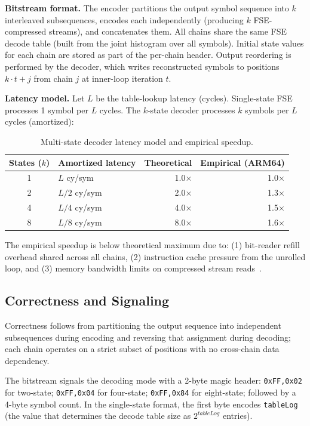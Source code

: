 \documentclass[journal]{IEEEtran}
\begin{document}
\textbf{Bitstream format.} The encoder partitions the output symbol
sequence into $k$ interleaved subsequences, encodes each independently
(producing $k$ FSE-compressed streams), and concatenates them. All chains
share the same FSE decode table (built from the joint histogram over all
symbols). Initial state values for each chain are stored as part of the
per-chain header. Output reordering is performed by the decoder, which
writes reconstructed symbols to positions $k\cdot t + j$ from chain $j$
at inner-loop iteration $t$.

\textbf{Latency model.} Let $L$ be the table-lookup latency (cycles).
Single-state FSE processes 1 symbol per $L$ cycles. The $k$-state decoder
processes $k$ symbols per $L$ cycles (amortized):

\begin{table}[htbp]
\centering
\caption{Multi-state decoder latency model and empirical speedup.}
\label{tab:latency}
\begin{tabular}{clrr}
\toprule
States ($k$) & Amortized latency & Theoretical & Empirical (ARM64) \\
\midrule
1 & $L$ cy/sym & 1.0$\times$ & 1.0$\times$ \\
2 & $L/2$ cy/sym & 2.0$\times$ & 1.3$\times$ \\
4 & $L/4$ cy/sym & 4.0$\times$ & 1.5$\times$ \\
8 & $L/8$ cy/sym & 8.0$\times$ & 1.6$\times$ \\
\bottomrule
\end{tabular}
\end{table}

The empirical speedup is below theoretical maximum due to: (1) bit-reader
refill overhead shared across all chains, (2) instruction cache pressure from
the unrolled loop, and (3) memory bandwidth limits on compressed stream
reads~\cite{williams2009}.

\subsection{Correctness and Signaling}
\label{sec:signaling}

Correctness follows from partitioning the output sequence into independent
subsequences during encoding and reversing that assignment during decoding;
each chain operates on a strict subset of positions with no cross-chain data
dependency.

The bitstream signals the decoding mode with a 2-byte magic header:
\texttt{0xFF,0x02} for two-state; \texttt{0xFF,0x04} for four-state;
\texttt{0xFF,0x84} for eight-state; followed by a 4-byte symbol count.
In the single-state format, the first byte encodes
\texttt{tableLog} (the value that determines the decode table size as
$2^{\textit{tableLog}}$ entries).
\end{document}
